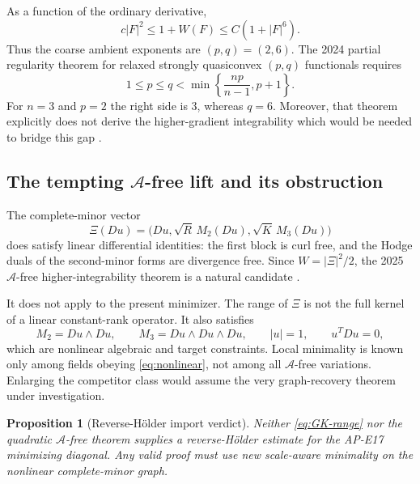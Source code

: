 \documentclass[10pt]{article}
\newtheorem{proposition}[theorem]{Proposition}
\begin{document}
As a function of the ordinary derivative,
\begin{equation}
 c|F|^2\leq 1+W(F)\leq C(1+|F|^6).                     \label{eq:pq}
\end{equation}
Thus the coarse ambient exponents are $(p,q)=(2,6)$.  The 2024 partial
regularity theorem for relaxed strongly quasiconvex $(p,q)$ functionals
requires
\begin{equation}
 1\leq p\leq q<
 \min\left\{\frac{np}{n-1},p+1\right\}.                \label{eq:GK-range}
\end{equation}
For $n=3$ and $p=2$ the right side is $3$, whereas $q=6$.  Moreover, that
theorem explicitly does not derive the higher-gradient integrability which
would be needed to bridge this gap \cite{GmeinederKristensen2024}.

\subsection{The tempting \texorpdfstring{\(\mathscr A\)}{A}-free lift and its obstruction}

The complete-minor vector
\begin{equation}
 \Xi(Du)=\bigl(Du,\sqrt R\,M_2(Du),\sqrt K\,M_3(Du)\bigr) \label{eq:Xi}
\end{equation}
does satisfy linear differential identities: the first block is curl free,
and the Hodge duals of the second-minor forms are divergence free.  Since
$W=|\Xi|^2/2$, the 2025 $\mathscr A$-free higher-integrability theorem is a
natural candidate \cite{Schiffer2025}.

It does not apply to the present minimizer.  The range of $\Xi$ is not the
full kernel of a linear constant-rank operator.  It also satisfies
\begin{equation}
 M_2=Du\wedge Du,\qquad
 M_3=Du\wedge Du\wedge Du,\qquad
 |u|=1,\qquad u^TDu=0,                                 \label{eq:nonlinear}
\end{equation}
which are nonlinear algebraic and target constraints.  Local minimality is
known only among fields obeying \eqref{eq:nonlinear}, not among all
$\mathscr A$-free variations.  Enlarging the competitor class would assume
the very graph-recovery theorem under investigation.

\begin{proposition}[Reverse-H\"older import verdict]
Neither \eqref{eq:GK-range} nor the quadratic $\mathscr A$-free theorem
supplies a reverse-H\"older estimate for the AP-E17 minimizing diagonal.
Any valid proof must use new scale-aware minimality on the nonlinear
complete-minor graph.
\end{proposition}
\end{document}
